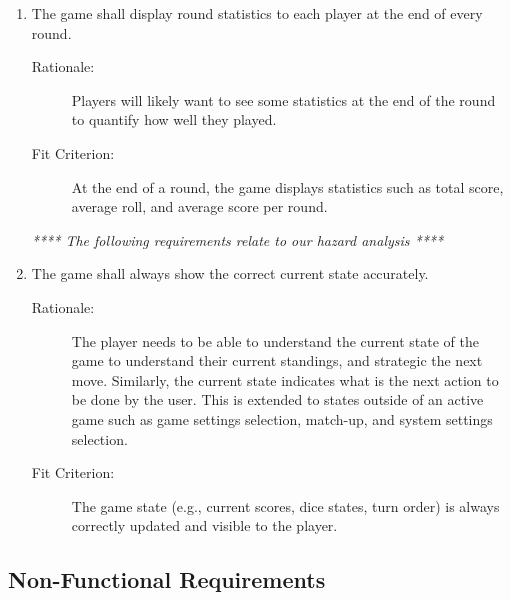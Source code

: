 \begin{enumerate}[label=R\arabic*, start=1, left=0pt]
    \item \label{R16} The game shall display round statistics to each player at the end of every round.
    \begin{description}
        \item[Rationale:] Players will likely want to see some statistics at the end of the round to quantify how well they played.
        \item[Fit Criterion:] At the end of a round, the game displays statistics such as total score, average roll, and average score per round.
    \end{description}

    \textit{**** The following requirements relate to our hazard analysis ****}
    \item \label{R17} The game shall always show the correct current state accurately.
    \begin{description}
        \item[Rationale:] The player needs to be able to understand the current state of the game to understand their current standings, and strategic the next move. Similarly, the current state indicates what is the next action to be done by the user. This is extended to states outside of an active game such as game settings selection, match-up, and system settings selection.
        \item[Fit Criterion:] The game state (e.g., current scores, dice states, turn order) is always correctly updated and visible to the player.
    \end{description}

\end{enumerate}

\subsection{Non-Functional Requirements}

